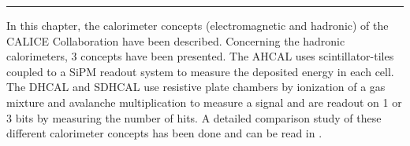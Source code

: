 \begin{center}
\rule{0.5\textwidth}{.4pt}
\end{center}

In this chapter, the calorimeter concepts (electromagnetic and hadronic) of the CALICE Collaboration have been described. Concerning the hadronic calorimeters, 3 concepts have been presented. The AHCAL uses scintillator-tiles coupled to a SiPM readout system to measure the deposited energy in each cell. The DHCAL and SDHCAL use resistive plate chambers by ionization of a gas mixture and avalanche multiplication to measure a signal and are readout on 1 or 3 bits by measuring the number of hits. A detailed comparison study of these different calorimeter concepts has been done and can be read in \cite{Neubueser2016}.
